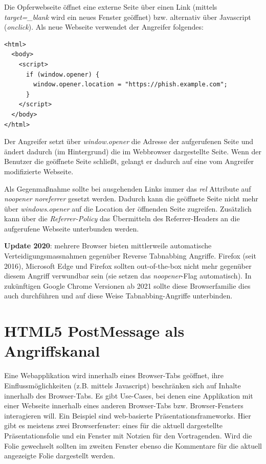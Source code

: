 Die Opferwebseite öffnet eine externe Seite über einen Link (mittels \textit{target=\_blank} wird ein neues Fenster geöffnet) bzw. alternativ über Javascript (\textit{onclick}). Als neue Webseite verwendet der Angreifer folgendes:

\begin{verbatim}
<html>
  <body>
    <script>
      if (window.opener) {
        window.opener.location = "https://phish.example.com";
      }
    </script>
  </body>
</html>
\end{verbatim}

Der Angreifer setzt über \textit{window.opener} die Adresse der aufgerufenen Seite und ändert dadurch (im Hintergrund) die im Webbrowser dargestellte Seite. Wenn der Benutzer die geöffnete Seite schließt, gelangt er dadurch auf eine vom Angreifer modifizierte Webseite.

Als Gegenmaßnahme sollte bei ausgehenden Links immer das \textit{rel} Attribute auf \textit{noopener noreferrer} gesetzt werden. Dadurch kann die geöffnete Seite nicht mehr über \textit{windows.opener} auf die Location der öffnenden Seite zugreifen. Zusätzlich kann über die \textit{Referrer-Policy} das Übermitteln des Referrer-Headers an die aufgerufene Webseite unterbunden werden.

\textbf{Update 2020}: mehrere Browser bieten mittlerweile automatische Verteidigungsmassnahmen gegenüber Reverse Tabnabbing Angriffe. Firefox (seit 2016), Microsoft Edge und Firefox sollten out-of-the-box nicht mehr gegenüber diesem Angriff verwundbar sein (sie setzen das \textit{noopener}-Flag automatisch). In zukünftigen Google Chrome Versionen ab 2021 sollte diese Browserfamilie dies auch durchführen und auf diese Weise Tabnabbing-Angriffe unterbinden.

\section{HTML5 PostMessage als Angriffskanal}

Eine Webapplikation wird innerhalb eines Browser-Tabs geöffnet, ihre Einflussmöglichkeiten (z.B. mittels Javascript) beschränken sich auf Inhalte innerhalb des Browser-Tabs. Es gibt Use-Cases, bei denen eine Applikation mit einer Webseite innerhalb eines anderen Browser-Tabs bzw. Browser-Fensters interagieren will. Ein Beispiel sind web-basierte Präsentationsframeworks. Hier gibt es meistens zwei Browserfenster: eines für die aktuell dargestellte Präsentationsfolie und ein Fenster mit Notzien für den Vortragenden. Wird die Folie gewechselt sollten im zweiten Fenster ebenso die Kommentare für die aktuell angezeigte Folie dargestellt werden.

